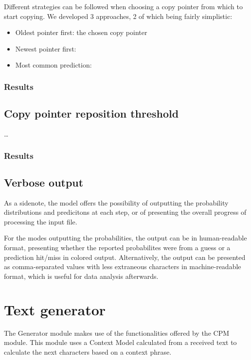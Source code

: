 \documentclass{article}
\begin{document}
Different strategies can be followed when choosing a copy pointer from which to start copying.
We developed 3 approaches, 2 of which being fairly simplistic:
\begin{itemize}
    \item Oldest pointer first: the chosen copy pointer
    \item Newest pointer first:
    \item Most common prediction:
\end{itemize}

\subsubsection{Results}

\subsection{Copy pointer reposition threshold}

\dots

\subsubsection{Results}

\subsection{Verbose output}

As a sidenote, the model offers the possibility of outputting the probability distributions and predicitons at each step, or of presenting the overall progress of processing the input file.

For the modes outputting the probabilities, the output can be in human-readable format, presenting whether the reported probabilites were from a guess or a prediction hit/miss in colored output.
Alternatively, the output can be presented as comma-separated values with less extraneous characters in machine-readable format, which is useful for data analysis afterwards.


\section{Text generator}
\label{sec:text-generator}

The Generator module makes use of the functionalities offered by the CPM module.
This module uses a Context Model calculated from a received text to calculate the
next characters based on a context phrase. 
\end{document}
